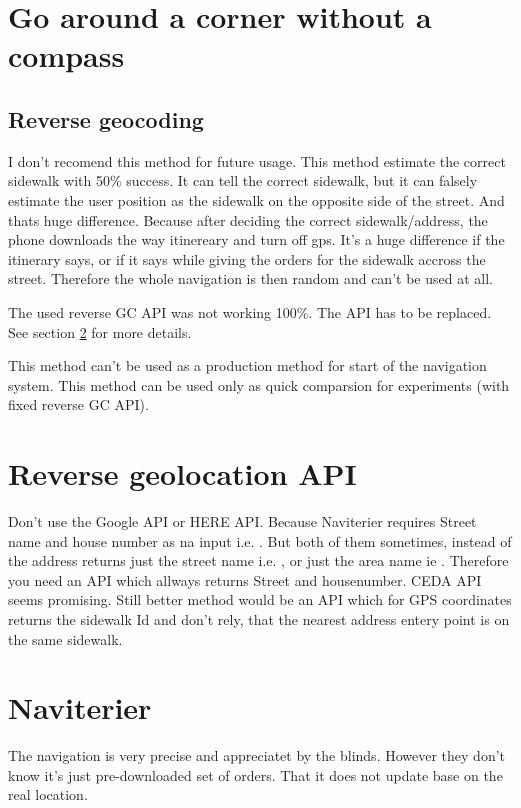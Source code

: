 \documentclass[11pt,oneside,a4paper]{book}
\begin{document}
			\section{Go around a corner without a compass}
				
			\subsection{Reverse geocoding}
				I don't recomend this method for future usage. This method estimate the correct sidewalk with 50\% success. It can tell the correct sidewalk, but it can falsely estimate the user position as the sidewalk on the opposite side of the street.  And thats huge difference. 
				Because after deciding the correct sidewalk/address, the phone downloads the way itinereary and turn off gps. It's a huge difference if the itinerary says,  or if it says  while giving the orders for the sidewalk accross the street. Therefore the whole navigation is then random and can't be used at all.
				
				The used reverse GC API was not working 100\%. The API has to be replaced. See section \ref{subsec:reverse-gc-api} for more details.
							
				This method can't be used as a production method for start of the navigation system.
				This method can be used only as quick comparsion for experiments (with fixed reverse GC API).
			
		\section{Reverse geolocation API}
			\label{subsec:reverse-gc-api}
			Don't use the Google API or HERE API. Because Naviterier requires Street name and house number as na input i.e. . But both of them sometimes, instead of the address  returns just the street name i.e. , or just the area name ie . Therefore you need an API which allways returns Street and housenumber. CEDA API seems promising. Still better method would be an API which for GPS coordinates returns the sidewalk Id and don't rely, that the nearest address entery point is on the same sidewalk.	
		\section{Naviterier}
			The navigation is very precise and appreciatet by the blinds. However they don't know it's just pre-downloaded set of orders. That it does not update base on the real location.
			
\end{document}
